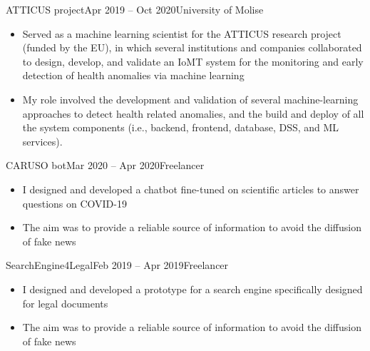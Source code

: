 	\medskip
	
		{ATTICUS project}{Apr 2019 – Oct 2020}{University of Molise}{\footnotesize{} \hspace{1pt}
		}
	\begin{itemize}
            \item Served as a machine learning scientist for the ATTICUS research project (funded by the EU), in which several institutions and companies collaborated to design, develop, and validate an IoMT system for the monitoring and early detection of health anomalies via machine learning
            \item My role involved the development and validation of several machine-learning approaches to detect health related anomalies, and the build and deploy of all the system components (i.e., backend, frontend, database, DSS, and ML services).
	\end{itemize}

	\medskip

		{CARUSO bot}{Mar 2020 – Apr 2020}{Freelancer}{\footnotesize{} \hspace{1pt}
		}
	\begin{itemize}
            \item I designed and developed a chatbot fine-tuned on scientific articles to answer questions on COVID-19
            \item The aim was to provide a reliable source of information to avoid the diffusion of fake news
	\end{itemize}

	\medskip

		{SearchEngine4Legal}{Feb 2019 – Apr 2019}{Freelancer}{\footnotesize{} \hspace{1pt}
		}
	\begin{itemize}
            \item I designed and developed a prototype for a search engine specifically designed for legal documents
            \item The aim was to provide a reliable source of information to avoid the diffusion of fake news
	\end{itemize}